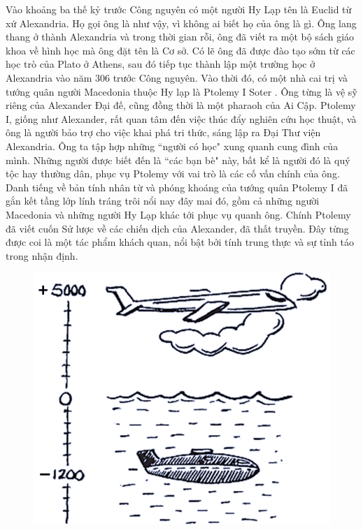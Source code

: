 \vspace*{-5pt}
\begin{multicols}{2}
	Vào khoảng ba thế kỷ trước Công nguyên có một người Hy Lạp tên là Euclid từ xứ Alexandria. Họ gọi ông là như vậy, vì không ai biết họ của ông là gì. Ông lang thang ở thành Alexandria và trong thời gian rỗi, ông đã viết ra một bộ sách giáo khoa về hình học mà ông đặt tên là Cơ sở. Có lẽ ông đã được đào tạo sớm từ các học trò của Plato ở Athens, sau đó tiếp tục thành lập một trường học ở Alexandria vào năm $306$ trước Công nguyên. 
	\vskip 0.1cm
	Vào thời đó, có một nhà cai trị và tướng quân người Macedonia thuộc Hy lạp  là Ptolemy I Soter . Ông từng là vệ sỹ riêng của Alexander Đại đế, cũng đồng thời là một pharaoh của Ai Cập. Ptolemy I, giống như Alexander, rất quan tâm đến việc thúc đẩy nghiên cứu học thuật, và ông là người bảo trợ cho việc khai phá tri thức, sáng lập ra Đại Thư viện Alexandria. Ông ta tập hợp những ``người có học" xung quanh cung đình của mình.  Những người được biết đến là ``các bạn bè" này, bất kể là người đó là quý tộc hay thường dân, phục vụ Ptolemy với vai trò là các cố vấn chính của ông. Danh tiếng về bản tính nhân từ và phóng khoáng của tướng quân Ptolemy I đã gắn kết tầng lớp lính tráng trôi nổi nay đây mai đó, gồm cả những người Macedonia và những người Hy Lạp khác  tới phục vụ quanh ông. Chính Ptolemy đã viết cuốn Sử lược về các chiến dịch của Alexander, đã thất truyền. Đây từng được coi là một tác phẩm khách quan, nổi bật bởi tính trung thực và sự tỉnh táo trong nhận định. 
	\begin{figure}[H]
		\vspace*{-5pt}
		\centering
		\captionsetup{labelformat= empty, justification=centering}
		\includegraphics[width= 1\linewidth]{1}

\end{figure}
\end{multicols}

